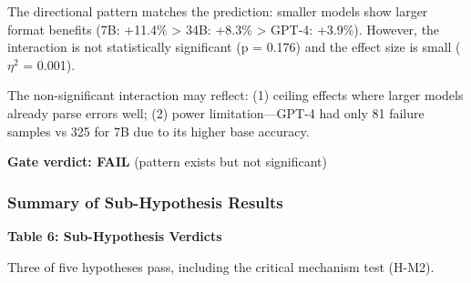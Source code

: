 The directional pattern matches the prediction: smaller models show larger format benefits (7B: +11.4\% > 34B: +8.3\% > GPT-4: +3.9\%). However, the interaction is not statistically significant (p = 0.176) and the effect size is small ($\eta^2$ = 0.001).

The non-significant interaction may reflect: (1) ceiling effects where larger models already parse errors well; (2) power limitation---GPT-4 had only 81 failure samples vs 325 for 7B due to its higher base accuracy.

\textbf{Gate verdict: FAIL} (pattern exists but not significant)

\subsubsection{Summary of Sub-Hypothesis Results}

\textbf{Table 6: Sub-Hypothesis Verdicts}

\begin{table}[htbp]
\centering
{}
\end{table}

Three of five hypotheses pass, including the critical mechanism test (H-M2).
